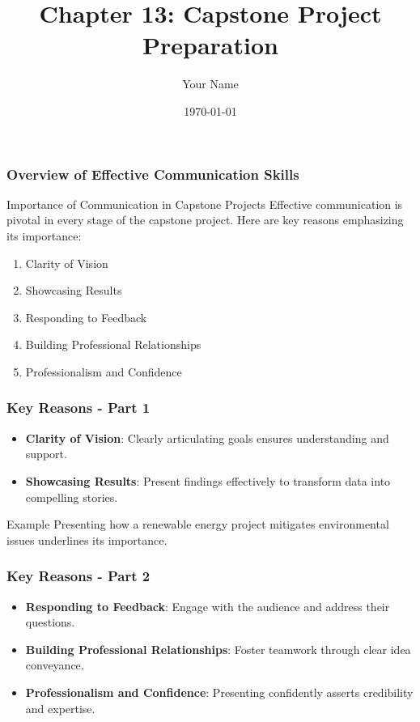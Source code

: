 \documentclass{beamer}
\title{Chapter 13: Capstone Project Preparation}
\author{Your Name}
\institute{Your Institution}
\date{\today}
\begin{document}
\frame{\titlepage}

\begin{frame}[fragile]
    \titlepage
\end{frame}

\begin{frame}[fragile]
    \frametitle{Overview of Effective Communication Skills}
    \begin{block}{Importance of Communication in Capstone Projects}
        Effective communication is pivotal in every stage of the capstone project. Here are key reasons emphasizing its importance:
    \end{block}
    \begin{enumerate}
        \item Clarity of Vision
        \item Showcasing Results
        \item Responding to Feedback
        \item Building Professional Relationships
        \item Professionalism and Confidence
    \end{enumerate}
\end{frame}

\begin{frame}[fragile]
    \frametitle{Key Reasons - Part 1}
    \begin{itemize}
        \item \textbf{Clarity of Vision}: Clearly articulating goals ensures understanding and support.
        \item \textbf{Showcasing Results}: Present findings effectively to transform data into compelling stories.
    \end{itemize}
    \begin{block}{Example}
        Presenting how a renewable energy project mitigates environmental issues underlines its importance.
    \end{block}
\end{frame}

\begin{frame}[fragile]
    \frametitle{Key Reasons - Part 2}
    \begin{itemize}
        \item \textbf{Responding to Feedback}: Engage with the audience and address their questions.
        \item \textbf{Building Professional Relationships}: Foster teamwork through clear idea conveyance.
        \item \textbf{Professionalism and Confidence}: Presenting confidently asserts credibility and expertise.
    \end{itemize}
\end{frame}
\end{document}

